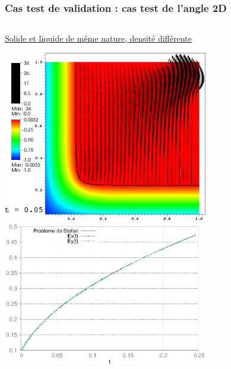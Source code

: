 \documentclass{beamer}
\begin{document}
\begin{frame}
    \frametitle{Cas test de validation : cas test de l'angle 2D}
	\tiny


\begin{columns}
\begin{column}{0.5 \textwidth}

\underline{Solide et liquide de même nature, densité différente}
     \begin{center}
        \includegraphics[width=0.7\textwidth]{Figures/angleIBCDiff0000.png}	\\
	\includegraphics[width=0.7\textwidth]{Figures/AngleExEyDiff.eps}
    \end{center}
\end{column}
    \begin{column}{0.5 \textwidth}
\begin{center}
		\begin{tikzpicture}[scale = 0.25, every node/.style={scale=0.25}]
			
		\end{tikzpicture}

\end{center}


   \end{column}
   \end{columns}


\end{frame}
\end{document}
